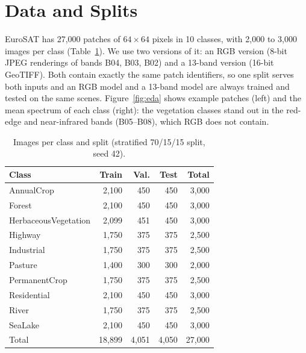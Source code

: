 \documentclass[twoside,a4paper,11pt]{article}
\begin{document}
\section{Data and Splits}\label{sec:data}
EuroSAT has 27{,}000 patches of $64\times64$ pixels in 10 classes, with 2{,}000 to 3{,}000 images per class (Table~\ref{tab:classes}). We use two versions of it: an RGB version (8-bit JPEG renderings of bands B04, B03, B02) and a 13-band version (16-bit GeoTIFF). Both contain exactly the same patch identifiers, so one split serves both inputs and an RGB model and a 13-band model are always trained and tested on the same scenes. Figure~\ref{fig:eda} shows example patches (left) and the mean spectrum of each class (right): the vegetation classes stand out in the red-edge and near-infrared bands (B05--B08), which RGB does not contain.
\begin{table}[t]
\centering
\caption{Images per class and split (stratified 70/15/15 split, seed 42).}
\label{tab:classes}
\small
\begin{tabular}{lrrrr}
\toprule
Class & Train & Val. & Test & Total \\
\midrule
AnnualCrop & 2{,}100 & 450 & 450 & 3{,}000 \\
Forest & 2{,}100 & 450 & 450 & 3{,}000 \\
HerbaceousVegetation & 2{,}099 & 451 & 450 & 3{,}000 \\
Highway & 1{,}750 & 375 & 375 & 2{,}500 \\
Industrial & 1{,}750 & 375 & 375 & 2{,}500 \\
Pasture & 1{,}400 & 300 & 300 & 2{,}000 \\
PermanentCrop & 1{,}750 & 375 & 375 & 2{,}500 \\
Residential & 2{,}100 & 450 & 450 & 3{,}000 \\
River & 1{,}750 & 375 & 375 & 2{,}500 \\
SeaLake & 2{,}100 & 450 & 450 & 3{,}000 \\
\midrule
Total & 18{,}899 & 4{,}051 & 4{,}050 & 27{,}000 \\
\bottomrule
\end{tabular}
\end{table}
\end{document}
